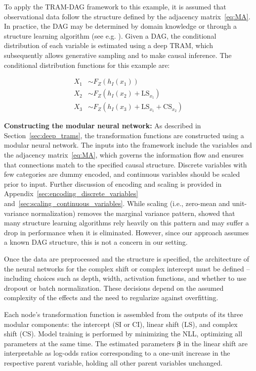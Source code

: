 To apply the TRAM-DAG framework to this example, it is assumed that observational data follow the structure defined by the adjacency matrix~\ref{eq:MA}. In practice, the DAG may be determined by domain knowledge or through a structure learning algorithm (see e.g. \citealp{zheng2018}). Given a DAG, the conditional distribution of each variable is estimated using a deep TRAM, which subsequently allows generative sampling and to make causal inference. The conditional distribution functions for this example are:

\[
\begin{aligned}
X_1 &\sim F_Z(h_I(x_1)) \\
X_2 &\sim F_Z(h_I(x_2) + \mathrm{LS}_{x_1}) \\
X_3 &\sim F_Z(h_I(x_3) + \mathrm{LS}_{x_1} + \mathrm{CS}_{x_2})
\end{aligned}
\]


\textbf{Constructing the modular neural network:} As described in Section~\ref{sec:deep_trams}, the transformation functions are constructed using a modular neural network. The inputs into the framework include the variables and the adjacency matrix~\ref{eq:MA}, which governs the information flow and ensures that connections match to the specified causal structure. Discrete variables with few categories are dummy encoded, and continuous variables should be scaled prior to input. Further discussion of encoding and scaling is provided in Appendix~\ref{sec:encoding_discrete_variables} and~\ref{sec:scaling_continuous_variables}.
While scaling (i.e., zero-mean and unit-variance normalization) removes the marginal variance pattern, \citet{reisach2021} showed that many structure learning algorithms rely heavily on this pattern and may suffer a drop in performance when it is eliminated. However, since our approach assumes a known DAG structure, this is not a concern in our setting.

Once the data are preprocessed and the structure is specified, the architecture of the neural networks for the complex shift or complex intercept must be defined -- including choices such as depth, width, activation functions, and whether to use dropout or batch normalization. These decisions depend on the assumed complexity of the effects and the need to regularize against overfitting.

Each node's transformation function is assembled from the outputs of its three modular components: the intercept (SI or CI), linear shift (LS), and complex shift (CS). Model training is performed by minimizing the NLL, optimizing all parameters at the same time. The estimated parameters $\boldsymbol{\beta}$ in the linear shift are interpretable as log-odds ratios corresponding to a one-unit increase in the respective parent variable, holding all other parent variables unchanged.




